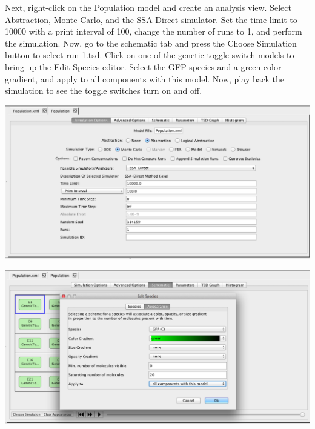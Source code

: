 \documentclass[titlepage,11pt]{article}
\begin{document}
Next, right-click on the Population model and create an analysis view.  Select Abstraction, Monte Carlo, and the SSA-Direct simulator.  Set the time limit to 10000 with a print interval of 100, change the number of runs to 1, and perform the simulation.  Now, go to the schematic tab and press the Choose Simulation button to select run-1.tsd.  Click on one of the genetic toggle switch models to bring up the Edit Species editor.  Select the GFP species and a green color gradient, and apply to all components with this model.  Now, play back the simulation to see the toggle switches turn on and off.

\begin{center}
\includegraphics[width=160mm]{screenshots/gridSimGT}
\end{center}


\begin{center}
\includegraphics[width=160mm]{screenshots/compAppearancesGT}
\end{center}
\end{document}
